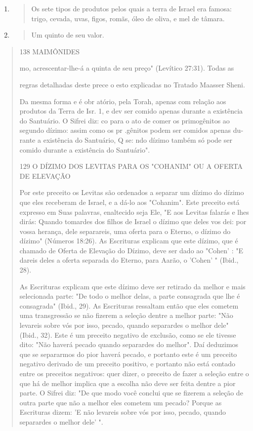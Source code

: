 \begin{enumerate}
\def\labelenumi{\arabic{enumi}.}
\setcounter{enumi}{165}
\item
  \begin{quote}
  Os sete tipos de produtos pelos quais a terra de Israel era famosa:
  trigo, cevada, uvas, figos, romãs, óleo de oliva, e mel de tâmara.
  \end{quote}
\item
  \begin{quote}
  Um quinto de seu valor.
  \end{quote}
\end{enumerate}

\begin{quote}
138 MAIMÔNIDES

mo, acrescentar-lhe-á a quinta de seu preço" (Levítico 27:31). Todas as

regras detalhadas deste prece o esto explicadas no Tratado Maasser
Sheni.

Da mesma forma e é obr atório, pela Torah, apenas com relação aos
produtos da Terra de Isr. 1, e dev ser comido apenas durante a
existência do Santuário. O Sifrei diz: co para o ato de comer os
primogênitos ao segundo dízimo: assim como os pr .gênitos podem ser
comidos apenas du­rante a existência do Santuário, Q se: ndo dízimo
também só pode ser comido durante a existência do Santuário".

129 O DÍZIMO DOS LEVITAS PARA OS "COHANIM" OU A OFERTA DE ELEVAÇÃO

Por este preceito os Levitas são ordenados a separar um dízimo do dízimo
que eles receberam de Israel, e a dá-lo aos "Cohanim". Este preceito
está expresso em Suas palavras, enaltecido seja Ele, "E aos Levitas
falarás e lhes dirás: Quando tomardes dos filhos de Israel o dízimo que
deles vos dei: por vossa herança, dele separareis, uma oferta para o
Eterno, o dízimo do dízimo" (Números 18:26). As Escrituras explicam que
este dízimo, que é chamado de Oferta de Elevação do Dízimo, deve ser
dado ao "Cohen' : "E dareis deles a oferta separada do Eterno, para
Aarão, o 'Cohen' " (Ibid., 28).

As Escrituras explicam que este dízimo deve ser retirado da melhor e
mais selecionada parte: "De todo o melhor delas, a parte consagrada que
lhe é consagrada" (Ibid., 29). As Escrituras ressaltam então que eles
cometem uma transgressão se não fizerem a seleção dentre a melhor parte:
"Não levareis so­bre vós por isso, pecado, quando separardes o melhor
dele" (Ibid., 32). Este é um preceito negativo de exclusão, como se ele
tivesse dito: "Não haverá pe­cado quando separardes do melhor". Daí
deduzimos que se separarmos do pior haverá pecado, e portanto este é um
preceito negativo derivado de um precei­to positivo, e portanto não está
contado entre os preceitos negativos: quer di­zer, o preceito de fazer a
seleção entre o que há de melhor implica que a esco­lha não deve ser
feita dentre a pior parte. O Sifrei diz: "De que modo você con­clui que
se fizerem a seleção de outra parte que não a melhor eles cometem um
pecado? Porque as Escrituras dizem: 'E não levareis sobre vós por isso,
pe­cado, quando separardes o melhor dele' ".


\end{quote}
